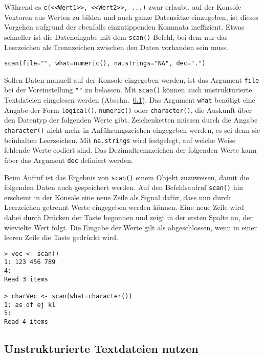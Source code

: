 Während es \lstinline!c(<<Wert1>>, <<Wert2>>, ...)! zwar erlaubt, auf der Konsole Vektoren aus Werten zu bilden und auch ganze Datensätze einzugeben, ist dieses Vorgehen aufgrund der ebenfalls einzutippenden Kommata ineffizient. Etwas schneller ist die Dateneingabe mit dem \lstinline!scan()! Befehl, bei dem nur das Leerzeichen als Trennzeichen zwischen den Daten vorhanden sein muss.
\begin{lstlisting}
scan(file="", what=numeric(), na.strings="NA", dec=".")
\end{lstlisting}

Sollen Daten manuell auf der Konsole eingegeben werden, ist das Argument \lstinline!file! bei der Voreinstellung \lstinline!""! zu belassen. Mit \lstinline!scan()! können auch unstrukturierte Textdateien eingelesen werden (Abschn.\ \ref{sec:readLines}). Das Argument \lstinline!what! benötigt eine Angabe der Form \lstinline!logical()!, \lstinline!numeric()! oder \lstinline!character()!, die Auskunft über den Datentyp der folgenden Werte gibt. Zeichenketten müssen durch die Angabe \lstinline!character()! nicht mehr in Anführungszeichen eingegeben werden, es sei denn sie beinhalten Leerzeichen. Mit \lstinline!na.strings! wird festgelegt, auf welche Weise fehlende Werte codiert sind. Das Dezimaltrennzeichen der folgenden Werte kann über das Argument \lstinline!dec! definiert werden.

Beim Aufruf ist das Ergebnis von \lstinline!scan()! einem Objekt zuzuweisen, damit die folgenden Daten auch gespeichert werden. Auf den Befehlsaufruf \lstinline!scan()! hin erscheint in der Konsole eine neue Zeile als Signal dafür, dass nun durch Leerzeichen getrennt Werte eingegeben werden können. Eine neue Zeile wird dabei durch Drücken der  Taste begonnen und zeigt in der ersten Spalte an, der wievielte Wert folgt. Die Eingabe der Werte gilt als abgeschlossen, wenn in einer leeren Zeile die  Taste gedrückt wird.
\begin{lstlisting}
> vec <- scan()
1: 123 456 789
4:
Read 3 items

> charVec <- scan(what=character())
1: as df ej kl
5:
Read 4 items
\end{lstlisting}

\subsection{Unstrukturierte Textdateien nutzen}
\label{sec:readLines}

